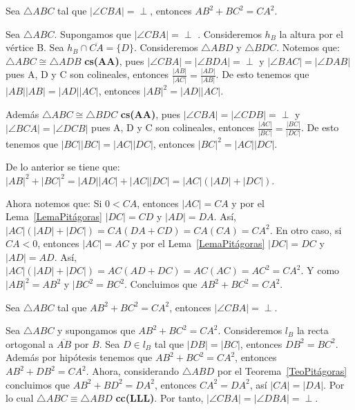 \begin{teo} [De Pitágoras]\label{TeoPitágoras}
Sea $\triangle ABC$ tal que $|\angle CBA|= \perp$, entonces $AB^{2} + BC^{2} = CA^{2}$.
\end{teo}
\begin{dem} Sea $\triangle ABC$.
Supongamos que $|\angle CBA|= \perp$ . Consideremos $h_{B}$ la altura por el vértice B. Sea $h_{B} \cap \overline{CA} =\{D\}$. Consideremos $\triangle ABD$ y $\triangle BDC$. Notemos que: $\triangle ABC \cong \triangle ADB$ \textbf{cs(AA)}, pues $|\angle CBA|=|\angle BDA|=\perp$ y $|\angle BAC|=|\angle DAB|$ pues A, D y C son colineales, entonces $\frac{|AB|}{|AC|}=\frac{|AD|}{|AB|}$. De esto tenemos que $|AB||AB|=|AD||AC|$, entonces $|AB|^{2}=|AD||AC|.$

Además $\triangle ABC \cong \triangle BDC$ \textbf{cs(AA)}, pues $|\angle CBA|=|\angle CDB|=\perp$ y $|\angle BCA|=|\angle DCB|$ pues A, D y C son colineales, entonces $\frac{|AC|}{|BC|}=\frac{|BC|}{|DC|}$. De esto tenemos que $|BC||BC|=|AC||DC|$, entonces $|BC|^{2}=|AC||DC|$. 
	
De lo  anterior se tiene que: $|AB|^{2}+|BC|^{2}=|AD||AC|+|AC||DC|=|AC|(|AD|+|DC|).$

Ahora notemos que: Si $0<CA$, entonces $|AC|=CA$ y por el Lema~\ref{LemaPitágoras} $|DC|=CD$ y $|AD|=DA.$ Así, $|AC|(|AD|+|DC|)= CA(DA+CD)=CA(CA)=CA^{2}.$
En otro caso, si $CA<0$, entonces $|AC|=AC$ y por el Lema~\ref{LemaPitágoras} $|DC|=DC$ y $|AD|=AD.$ Así, $|AC|(|AD|+|DC|)= AC(AD+DC)=AC(AC)=AC^{2}=CA^{2}.$ Y como $|AB|^{2}= AB^{2}$ y $|BC^{2}= BC^{2}$. Concluimos que $AB^{2}+BC^{2}=CA^{2}$.
\end{dem}

\begin{teo}
Sea $\triangle ABC$ tal que $AB^{2} + BC^{2} = CA^{2}$, entonces $|\angle CBA|= \perp$.
\end{teo}
\begin{dem}
Sea $\triangle ABC$ y supongamos que $AB^{2} + BC^{2} = CA^{2}$. Consideremos $l_{B}$ la recta ortogonal a $\overline{AB}$ por $B$. Sea $D \in l_{B}$ tal que $|DB|=|BC|$, entonces $DB^{2}=BC^{2}$.
Además por hipótesis tenemos que $AB^{2} + BC^{2} = CA^{2}$, entonces $AB^{2} + DB^{2} = CA^{2}.$
Ahora, considerando $\triangle ABD$ por el Teorema~\ref{TeoPitágoras} concluimos que $AB^{2} + BD^{2} = DA^{2}$, entonces $CA^{2}=DA^{2}$, así $|CA|=|DA|.$ Por lo cual $\triangle ABC\equiv \triangle ABD$ \textbf{cc(LLL)}. Por tanto, $|\angle CBA|=|\angle DBA|=\perp.$ 
\end{dem}
     
